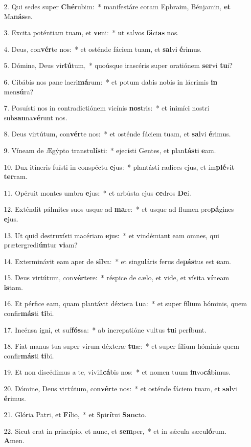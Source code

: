 2. Qui sedes super \textbf{Ché}rubim:~*  manifestáre coram Ephraim, Bénjamin, \textbf{et} Ma\textbf{nás}se.\

3. Excita poténtiam tuam, et \textbf{ve}ni:~*  ut salvos \textbf{fá}ci\textbf{as} nos.\

4. Deus, con\textbf{vér}te nos:~*  et osténde fáciem tuam, et \textbf{sal}vi \textbf{é}rimus.\

5. Dómine, Deus vir\textbf{tú}tum,~*  quoúsque irascéris super oratiónem \textbf{ser}vi \textbf{tu}i?\

6. Cibábis nos pane lacri\textbf{má}rum:~*  et potum dabis nobis in lácrimis \textbf{in} men\textbf{sú}ra?\

7. Posuísti nos in contradictiónem vicínis \textbf{nos}tris:~*  et inimíci nostri sub\textbf{san}na\textbf{vé}runt nos.\

8. Deus virtútum, con\textbf{vér}te nos:~*  et osténde fáciem tuam, et \textbf{sal}vi \textbf{é}rimus.\

9. Víneam de Ægýpto transtu\textbf{lís}ti:~*  ejecísti Gentes, et plan\textbf{tás}ti \textbf{e}am.\

10. Dux itíneris fuísti in conspéctu \textbf{e}jus:~*  plantásti radíces ejus, et im\textbf{plé}vit \textbf{ter}ram.\

11. Opéruit montes umbra \textbf{e}jus:~*  et arbústa ejus \textbf{ce}dros \textbf{De}i.\

12. Exténdit pálmites suos usque ad \textbf{ma}re:~*  et usque ad flumen pro\textbf{pá}gines \textbf{e}jus.\

13. Ut quid destruxísti macériam \textbf{e}jus:~*  et vindémiant eam omnes, qui prætergredi\textbf{ún}tur \textbf{vi}am?\

14. Exterminávit eam aper de \textbf{sil}va:~*  et singuláris ferus de\textbf{pás}tus est \textbf{e}am.\

15. Deus virtútum, con\textbf{vér}tere:~*  réspice de cælo, et vide, et vísita \textbf{ví}neam \textbf{is}tam.\

16. Et pérfice eam, quam plantávit déxtera \textbf{tu}a:~*  et super fílium hóminis, quem confir\textbf{más}ti \textbf{ti}bi.\

17. Incénsa igni, et suf\textbf{fós}sa:~*  ab increpatióne vultus \textbf{tu}i per\textbf{í}bunt.\

18. Fiat manus tua super virum déxteræ \textbf{tu}æ:~*  et super fílium hóminis quem confir\textbf{más}ti \textbf{ti}bi.\

19. Et non discédimus a te, vivifi\textbf{cá}bis nos:~*  et nomen tuum \textbf{in}vo\textbf{cá}bimus.\

20. Dómine, Deus virtútum, con\textbf{vér}te nos:~*  et osténde fáciem tuam, et \textbf{sal}vi \textbf{é}rimus.\

21. Glória Patri, et \textbf{Fí}lio,~*  et Spi\textbf{rí}tui \textbf{Sanc}to.\

22. Sicut erat in princípio, et nunc, et \textbf{sem}per,~*  et in sǽcula sæcu\textbf{ló}rum. \textbf{A}men.\


